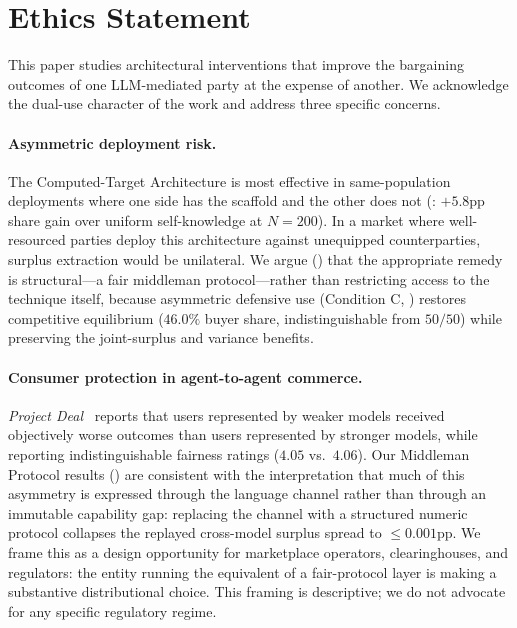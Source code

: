 \documentclass[11pt,a4paper]{article}
\begin{document}
\section*{Ethics Statement}

This paper studies architectural interventions that improve the bargaining outcomes of one LLM-mediated party at the expense of another. We acknowledge the dual-use character of the work and address three specific concerns.

\paragraph{Asymmetric deployment risk.} The Computed-Target Architecture is most effective in same-population deployments where one side has the scaffold and the other does not (: $+5.8$pp share gain over uniform self-knowledge at $N\!=\!200$). In a market where well-resourced parties deploy this architecture against unequipped counterparties, surplus extraction would be unilateral. We argue () that the appropriate remedy is structural---a fair middleman protocol---rather than restricting access to the technique itself, because asymmetric defensive use (Condition C, ) restores competitive equilibrium ($46.0\%$ buyer share, indistinguishable from $50/50$) while preserving the joint-surplus and variance benefits.

\paragraph{Consumer protection in agent-to-agent commerce.} \emph{Project Deal}~\citep{anthropic2026projectdeal} reports that users represented by weaker models received objectively worse outcomes than users represented by stronger models, while reporting indistinguishable fairness ratings ($4.05$ vs.\ $4.06$). Our Middleman Protocol results () are consistent with the interpretation that much of this asymmetry is expressed through the language channel rather than through an immutable capability gap: replacing the channel with a structured numeric protocol collapses the replayed cross-model surplus spread to $\le 0.001$pp. We frame this as a design opportunity for marketplace operators, clearinghouses, and regulators: the entity running the equivalent of a fair-protocol layer is making a substantive distributional choice. This framing is descriptive; we do not advocate for any specific regulatory regime.
\end{document}
